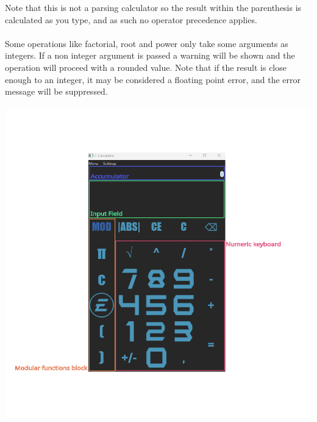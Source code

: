 \documentclass{article}
\begin{document}
	Note that this is not a parsing calculator so the result within the parenthesis is calculated as you type, and as such no operator precedence applies.\\
	\\
	Some operations like factorial, root and power only take some arguments as integers.
	If a non integer argument is passed a warning will be shown and the operation will proceed with a rounded value. Note that if the result is close enough to an integer, it may be considered a floating point error, and the error message will be suppressed.\\
	\\
	\includegraphics[width=\textwidth]{kalkulacka_comment}
	
\end{document}
